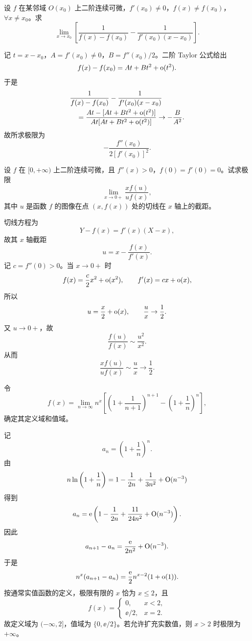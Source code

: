 \begin{xexercise}[6]
设 $f$ 在某邻域 $O(x_0)$ 上二阶连续可微，$f'(x_0)\ne0$，$f(x)\ne f(x_0)$，$\forall x\ne x_0$。求
  \[
    \lim_{x\to x_0}\left[\frac1{f(x)-f(x_0)}-\frac1{f'(x_0)(x-x_0)}\right].
  \]
\end{xexercise}
\begin{xsolution}
记 $t=x-x_0$，$A=f'(x_0)\ne0$，$B=f''(x_0)/2$。二阶 Taylor 公式给出
\[
  f(x)-f(x_0)=At+Bt^2+\mathrm{o}(t^2).
\]
于是
\begin{align*}
  &\frac1{f(x)-f(x_0)}-\frac1{f'(x_0)(x-x_0)}\\
  &\quad=\frac{At-[At+Bt^2+\mathrm{o}(t^2)]}
  {At[At+Bt^2+\mathrm{o}(t^2)]}
  \to-\frac{B}{A^2}.
\end{align*}
故所求极限为
\[
  -\frac{f''(x_0)}{2[f'(x_0)]^2}.
\]
\end{xsolution}


\begin{xexercise}[7]
设 $f$ 在 $[0,+\infty)$ 上二阶连续可微，且 $f''(x)>0$，$f(0)=f'(0)=0$。试求极限
  \[
    \lim_{x\to0+}\frac{xf(u)}{uf(x)},
  \]
  其中 $u$ 是函数 $f$ 的图像在点 $(x,f(x))$ 处的切线在 $x$ 轴上的截距。
\end{xexercise}
\begin{xsolution}
切线方程为
\[
  Y-f(x)=f'(x)(X-x),
\]
故其 $x$ 轴截距
\[
  u=x-\frac{f(x)}{f'(x)}.
\]
记 $c=f''(0)>0$。当 $x\to0+$ 时
\[
  f(x)=\frac c2x^2+\mathrm{o}(x^2),\qquad
  f'(x)=cx+\mathrm{o}(x),
\]
所以
\[
  u=\frac x2+\mathrm{o}(x),\qquad \frac ux\to\frac12.
\]
又 $u\to0+$，故
\[
  \frac{f(u)}{f(x)}\sim\frac{u^2}{x^2}.
\]
从而
\[
  \frac{x f(u)}{u f(x)}\sim\frac ux\to\frac12.
\]
\end{xsolution}


\begin{xexercise}[8]
令
  \[
    f(x)=\lim_{n\to\infty}n^x\left[\left(1+\frac1{n+1}\right)^{n+1}-\left(1+\frac1n\right)^n\right],
  \]
  确定其定义域和值域。
\end{xexercise}
\begin{xsolution}
记
\[
  a_n=\left(1+\frac1n\right)^n.
\]
由
\[
  n\ln\left(1+\frac1n\right)
  =1-\frac1{2n}+\frac1{3n^2}+\mathrm{O}(n^{-3})
\]
得到
\[
  a_n=\mathrm{e}\left(1-\frac1{2n}+\frac{11}{24n^2}+\mathrm{O}(n^{-3})\right).
\]
因此
\[
  a_{n+1}-a_n=\frac{\mathrm{e}}{2n^2}+\mathrm{O}(n^{-3}).
\]
于是
\[
  n^x(a_{n+1}-a_n)
  =\frac{\mathrm{e}}2 n^{x-2}(1+\mathrm{o}(1)).
\]
按通常实值函数的定义，极限有限的 $x$ 恰为 $x\le2$，且
\[
  f(x)=
  \begin{cases}
    0,&x<2,\\
    \ee/2,&x=2.
  \end{cases}
\]
故定义域为 $(-\infty,2]$，值域为 $\{0,\ee/2\}$。若允许扩充实数值，则 $x>2$ 时极限为 $+\infty$。
\end{xsolution}


